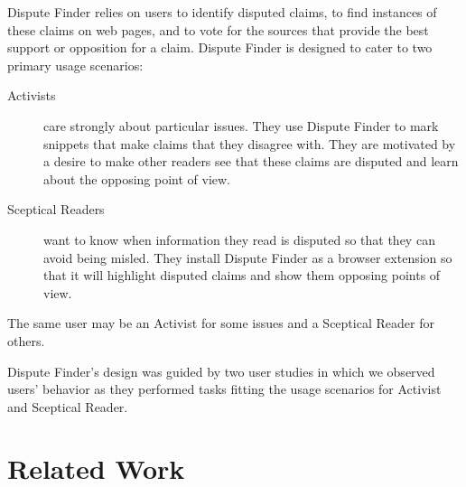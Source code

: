 \documentclass{www2010-submission}
\newcommand{\todo}[1]{}
\begin{document}
Dispute Finder relies on users to identify disputed claims, to find instances of these claims on web pages, and to vote for the sources that provide the best support or opposition for a claim. 
Dispute Finder is designed to cater to two primary usage scenarios:

\begin{description}
\item[Activists] care strongly about particular issues. They use Dispute Finder to mark snippets that make claims that they disagree with. They are motivated by a desire to make other readers see that these claims are disputed and learn about the opposing point of view.

\item[Sceptical Readers] want to know when information they read is disputed so that they can avoid being misled. They install Dispute Finder as a browser extension so that it will highlight disputed claims and show them opposing points of view.
\end{description}

The same user may be an Activist for some issues and a Sceptical Reader for others.



\todo{Claim panel should have 'more' buttons}

Dispute Finder's design was guided by two user studies in which we observed users' behavior as they performed tasks fitting the usage scenarios for Activist and Sceptical Reader.

\todo{Talk about automatically including all arguments from Snopes}
\todo{I think we need to do some kind of evaluation of the new interface, even if it is just showing it to some people, or having people in the lab try it.}
\todo{Need figures saying how efficient it is for an activist user to mark up a topic}



\section{Related Work}
\todo{Don't cite things that aren't relevant}
\end{document}
